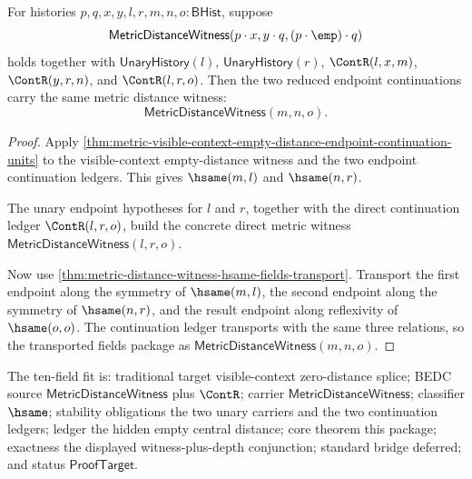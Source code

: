 \begin{theorem}
\label{thm:metric-visible-context-empty-distance-two-sided-endpoint-witness-transport}
For histories $p,q,x,y,l,r,m,n,o:\mathsf{BHist}$, suppose
$$
\mathsf{MetricDistanceWitness}(p\cdot x,y\cdot q,(p\cdot\emp)\cdot q)
$$
holds together with $\mathsf{UnaryHistory}(l)$, $\mathsf{UnaryHistory}(r)$,
$\ContR(l,x,m)$, $\ContR(y,r,n)$, and $\ContR(l,r,o)$. Then the two reduced
endpoint continuations carry the same metric distance witness:
$$
\mathsf{MetricDistanceWitness}(m,n,o).
$$
\end{theorem}
\begin{proof}
Apply \autoref{thm:metric-visible-context-empty-distance-endpoint-continuation-units}
to the visible-context empty-distance witness and the two endpoint continuation
ledgers. This gives $\hsame(m,l)$ and $\hsame(n,r)$.

The unary endpoint hypotheses for $l$ and $r$, together with the direct
continuation ledger $\ContR(l,r,o)$, build the concrete direct metric witness
$\mathsf{MetricDistanceWitness}(l,r,o)$.

Now use
\autoref{thm:metric-distance-witness-hsame-fields-transport}. Transport the
first endpoint along the symmetry of $\hsame(m,l)$, the second endpoint along
the symmetry of $\hsame(n,r)$, and the result endpoint along reflexivity of
$\hsame(o,o)$. The continuation ledger transports with the same three
relations, so the transported fields package as
$\mathsf{MetricDistanceWitness}(m,n,o)$.
\end{proof}

The ten-field fit is: traditional target visible-context zero-distance splice;
BEDC source $\mathsf{MetricDistanceWitness}$ plus $\ContR$; carrier
$\mathsf{MetricDistanceWitness}$; classifier $\hsame$; stability obligations
the two unary carriers and the two continuation ledgers; ledger the hidden
empty central distance; core theorem this package; exactness the displayed
witness-plus-depth conjunction; standard bridge deferred; and status
$\mathsf{ProofTarget}$.
